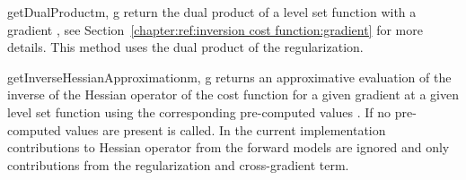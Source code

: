 \begin{methoddesc}[InversionCostFunction]{getDualProduct}{m, g}
return the dual product of a level set function  
with a gradient , see Section~\ref{chapter:ref:inversion cost function:gradient} for more details.
This method uses the dual product of the regularization. 
\end{methoddesc}

\begin{methoddesc}[InversionCostFunction]{getInverseHessianApproximation}{m, g }
returns an approximative evaluation of the inverse of the Hessian operator of the cost function 
for a given gradient  at a given level set function 
using the corresponding pre-computed values . If no pre-computed values are present
 is called. In the current implementation
contributions to Hessian operator from the forward models are ignored and only contributions
from the regularization and cross-gradient term.
\end{methoddesc}
        

